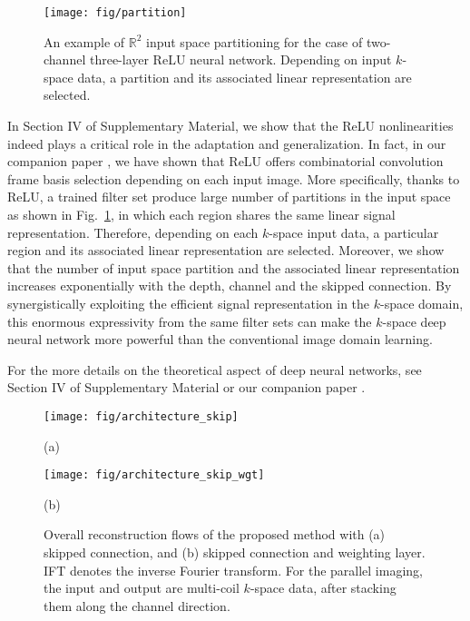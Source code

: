 \documentclass[10pt,journal]{IEEEtran}
\newcommand{\Rd}{{\mathbb R}}
\newcommand{\0}{{\boldsymbol{0}}}
\begin{document}
\begin{figure}[!h] 	
\centering
{\texttt{[image: fig/partition]}}
\caption{An example of $\Rd^2$ input space partitioning for the case of two-channel three-layer ReLU neural network.
Depending on input $k$-space data, a partition and its associated linear representation are selected. }\label{fig:input}
\end{figure}



In Section IV of Supplementary Material,  we show that the ReLU nonlinearities indeed plays a critical role
in  the adaptation and generalization.
In fact, 
in our companion paper \cite{ye2019cnn},  
we have shown that ReLU offers  combinatorial convolution frame basis selection depending on each input image.
More specifically,
 thanks to ReLU, a trained filter set produce  large number of 
  partitions in the input space as shown in Fig.~\ref{fig:input},
 in which each region shares the same linear signal representation. Therefore, depending on each $k$-space  input data,  a particular region and its associated linear representation are selected.
Moreover,  we show that
the number of input space partition and the
associated linear representation increases exponentially with the depth, channel and the skipped connection. 
By synergistically exploiting the efficient signal representation  in the $k$-space domain,
this enormous expressivity from the same filter sets can make the $k$-space deep neural
network more powerful than the conventional image domain learning.



For the more details on the theoretical aspect of  deep neural networks, see  Section IV of Supplementary Material
or our companion paper \cite{ye2019cnn}.






\begin{figure}[!t] 	
\centerline{\texttt{[image: fig/architecture\_skip]}}
\vspace*{-0.7cm}
\centerline{\mbox{(a)}}
\vspace*{0.2cm}
\centerline{\texttt{[image: fig/architecture\_skip\_wgt]}}
\vspace*{-0.7cm}
\centerline{\mbox{(b)}}
\caption{Overall reconstruction flows of the proposed method with (a) skipped connection, and (b) skipped connection and weighting layer. IFT denotes the inverse Fourier transform. For the parallel imaging, the input and output are multi-coil $k$-space data, after stacking them along
the channel direction. }
\label{fig:architecture}
\end{figure}
\end{document}
